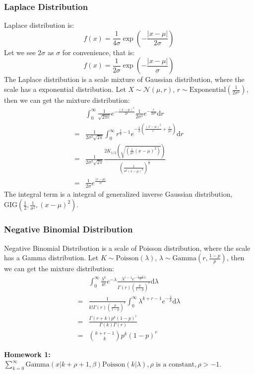 \documentclass[11pt]{article}
\def\MN{{\mathcal N}}
\begin{document}
\subsubsection{Laplace Distribution}
Laplace distribution is:
$$f(x) = \frac{1}{4\sigma}\exp(-\frac{|x-\mu|}{2\sigma})$$
Let we see $2\sigma$ as $\sigma$ for convenience, that is:
$$f(x) = \frac{1}{2\sigma}\exp(-\frac{|x-\mu|}{\sigma})$$
The Laplace distribution is a scale mixture of Gaussian distribution, where the scale has a exponential distribution.
Let $X \sim \MN(\mu, r)$, $r \sim \mbox{Exponential}(\frac{1}{2\sigma^2})$, then we can get the mixture distribution:
\[\begin{split} &
\int_0^\infty \frac{1}{\sqrt{2\pi r}} e^{-\frac{(x-\mu)^2}{2r}}
\frac{1}{2\sigma^2} e^{-\frac{r}{2\sigma^2}} \mathrm{d}r  \\
 = & \frac{1}{2\sigma^2 \sqrt{2\pi}}  \int_0^\infty
 r^{\frac{1}{2} - 1} e^{-\frac{1}{2} \left( \frac{(x-\mu)^2}{r} + \frac{r}{\sigma^2}\right)} \mathrm{d}r  \\
 = & \frac{1}{2\sigma^2 \sqrt{2\pi}} \frac{2K_{1/2}\left(\sqrt{(\frac{1}{\sigma^2}(x-\mu)^2)}\right)}{(\frac{1}{\sigma^2(x-\mu)^2})^{\frac{1}{4}}} \\
 = &\frac{1}{2\sigma} e^{\frac{|x-\mu|}{\sigma}}
\end{split}\]
The integral term is a integral of generalized inverse Gaussian distribution, $\mbox{GIG}(\frac{1}{2},\frac{1}{\sigma^2},(x-\mu)^2)$.

\subsubsection{Negative Binomial Distribution}
Negative Binomial Distribution is a scale of Poisson distribution, where the scale has a Gamma distribution.
Let $K \sim \mbox{Poisson}(\lambda)$, $\lambda \sim \mbox{Gamma}(r, \frac{1-p}{p})$, then we can get the mixture distribution:
\[\begin{split}
&  \int_0^\infty \frac{\lambda^k}{k!} e^{-\lambda}
\frac{\lambda^{r-1} e^{-\frac{1-p}{p} \lambda}}{\Gamma(r) (\frac{p}{1-p})^r} \mathrm{d}\lambda \\
= & \frac{1}{k! \Gamma(r) (\frac{p}{1-p})^r}  \int_0^\infty  \lambda^{k+r-1}  e^{-\frac{\lambda}{p}} \mathrm{d}\lambda \\
=&\frac{\Gamma(r+k)p^k(1-p)^r}{\Gamma(k)\Gamma(r)}\\
= & {k+r-1 \choose k} p^k (1-p)^r
\end{split}\]

\textbf{Homework 1:}   $\sum\limits_{k=0}^\infty \mbox{Gamma}(x | k+\rho+1, \beta) \mbox{Poisson} (k | \lambda),  \rho\mbox{ is a constant},\rho>-1$.
\end{document}

